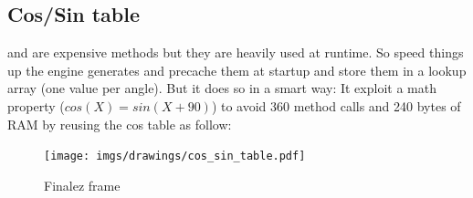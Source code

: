 \subsection{Cos/Sin table}
 and  are expensive methods but they are heavily used at runtime. So speed things up the engine generates and precache them at startup and store them in a lookup array (one value per angle). But it does so in a smart way: It exploit a math property ($cos(X) = sin(X + 90)$) to avoid 360  method calls and 240 bytes of RAM by reusing the cos table as follow:\\
\par

\begin{minipage}{\textwidth}

\end{minipage}


\begin{figure}[H]
 \centering
  \texttt{[image: imgs/drawings/cos\_sin\_table.pdf]}
 \caption{Finalez frame} 
\end{figure}
